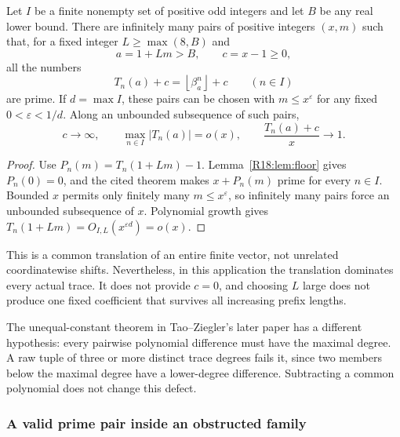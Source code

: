 \documentclass[11pt,a4paper]{article}
\theoremstyle{definition}\newtheorem{definition}[theorem]{Definition}
\theoremstyle{remark}\newtheorem{remark}[theorem]{Remark}
\newcommand{\floor}[1]{\left\lfloor#1\right\rfloor}
\begin{document}
\begin{proposition}\label{R18:prop:translated}
Let $I$ be a finite nonempty set of positive odd integers and let $B$
be any real lower bound. There are infinitely many pairs of positive
integers $(x,m)$ such that, for a fixed integer
$L\ge\max(8,B)$ and
\[
 a=1+Lm>B,\qquad c=x-1\ge0,
\]
all the numbers
\[
 T_n(a)+c=\floor{\beta_a^n}+c\qquad(n\in I)
\]
are prime. If $d=\max I$, these pairs can be chosen with
$m\le x^\varepsilon$ for any fixed $0<\varepsilon<1/d$.
Along an unbounded subsequence of such pairs,
\begin{equation}\label{R18:eq:dominating-shift}
 c\longrightarrow\infty,\qquad
 \max_{n\in I}|T_n(a)|=o(x),\qquad
 \frac{T_n(a)+c}{x}\longrightarrow1.
\end{equation}
\end{proposition}
\begin{proof}
Use $P_n(m)=T_n(1+Lm)-1$. Lemma~\ref{R18:lem:floor} gives $P_n(0)=0$,
and the cited theorem makes $x+P_n(m)$ prime for every $n\in I$.
Bounded $x$ permits only finitely many $m\le x^\varepsilon$, so
infinitely many pairs force an unbounded subsequence of $x$. Polynomial
growth gives $T_n(1+Lm)=O_{I,L}(x^{\varepsilon d})=o(x)$.
\end{proof}

This is a common translation of an entire finite vector, not unrelated
coordinatewise shifts. Nevertheless, in this application the translation
dominates every actual trace. It does not provide $c=0$, and choosing
$L$ large does not produce one fixed coefficient that survives all
increasing prefix lengths.

The unequal-constant theorem in Tao--Ziegler's later paper
\cite[Theorems 1.2 and 1.4, Corollary 1.5]{R18-TZ2016} has a different
hypothesis: every pairwise polynomial difference must have the maximal
degree. A raw tuple of three or more distinct trace degrees fails it,
since two members below the maximal degree have a lower-degree
difference. Subtracting a common polynomial does not change this defect.

\subsubsection{A valid prime pair inside an obstructed family}
\end{document}
